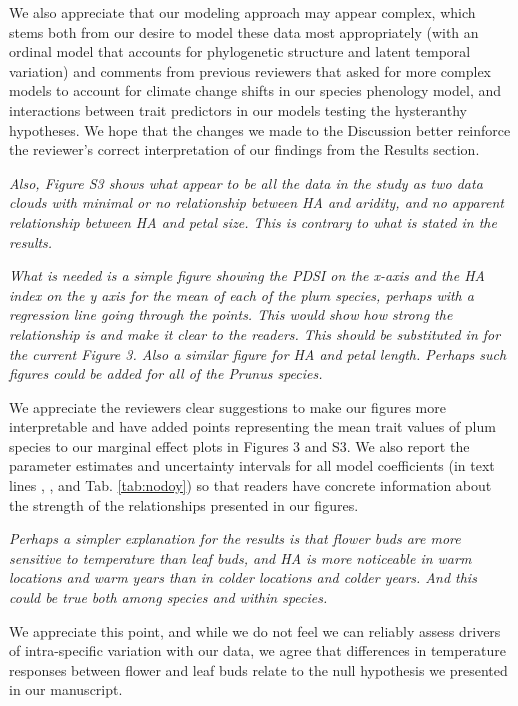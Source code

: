 \documentclass{article}[12pt]
\begin{document}
We also appreciate that our modeling approach may appear complex, which stems both from our desire to model these data most appropriately (with an ordinal model that accounts for phylogenetic structure and latent temporal variation) and comments from previous reviewers that asked for more complex models to account for climate change shifts in our species phenology model, and interactions between trait predictors in our models testing the hysteranthy hypotheses. We hope that the changes we made to the Discussion better reinforce the reviewer's correct interpretation of our findings from the Results section.

\emph{Also, Figure S3 shows what appear to be all the data in the study as two data clouds with minimal or no relationship between HA and aridity, and no apparent relationship between HA and petal size.  This is contrary to what is stated in the results.}

\emph{What is needed is a simple figure showing the PDSI on the x-axis and the HA index on the y axis for the mean of each of the plum species, perhaps with a regression line going through the points. This would show how strong the relationship is and make it clear to the readers. This should be substituted in for the current Figure 3.  Also a similar figure for HA and petal length. Perhaps such figures could be added for all of the Prunus species.}

We appreciate the reviewers clear suggestions to make our figures more interpretable and have added points representing the mean trait values of plum species to our marginal effect plots in Figures 3 and S3. We also report the parameter estimates and uncertainty intervals for all model coefficients (in text lines , , and Tab. \ref{tab:nodoy}) so that readers have concrete information about the strength of the relationships presented in our figures.


\emph{Perhaps a simpler explanation for the results is that flower buds are more sensitive to temperature than leaf buds, and HA is more noticeable in warm locations and warm years than in colder locations and colder years. And this could be true both among species and within species.}

We appreciate this point, and while we do not feel we can reliably assess drivers of intra-specific variation with our data, we agree that differences in temperature responses between flower and leaf buds relate to the null hypothesis we presented in our manuscript.
\end{document}
